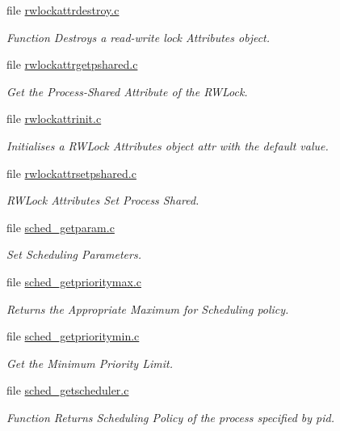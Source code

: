 \begin{DoxyCompactItemize}
file \mbox{\hyperlink{rwlockattrdestroy_8c}{rwlockattrdestroy.\+c}}
\begin{DoxyCompactList}\small\item\em Function Destroys a read-\/write lock Attributes object. \end{DoxyCompactList}\item 
file \mbox{\hyperlink{rwlockattrgetpshared_8c}{rwlockattrgetpshared.\+c}}
\begin{DoxyCompactList}\small\item\em Get the Process-\/\+Shared Attribute of the R\+W\+Lock. \end{DoxyCompactList}\item 
file \mbox{\hyperlink{rwlockattrinit_8c}{rwlockattrinit.\+c}}
\begin{DoxyCompactList}\small\item\em Initialises a R\+W\+Lock Attributes object attr with the default value. \end{DoxyCompactList}\item 
file \mbox{\hyperlink{rwlockattrsetpshared_8c}{rwlockattrsetpshared.\+c}}
\begin{DoxyCompactList}\small\item\em R\+W\+Lock Attributes Set Process Shared. \end{DoxyCompactList}\item 
file \mbox{\hyperlink{sched__getparam_8c}{sched\+\_\+getparam.\+c}}
\begin{DoxyCompactList}\small\item\em Set Scheduling Parameters. \end{DoxyCompactList}\item 
file \mbox{\hyperlink{sched__getprioritymax_8c}{sched\+\_\+getprioritymax.\+c}}
\begin{DoxyCompactList}\small\item\em Returns the Appropriate Maximum for Scheduling policy. \end{DoxyCompactList}\item 
file \mbox{\hyperlink{sched__getprioritymin_8c}{sched\+\_\+getprioritymin.\+c}}
\begin{DoxyCompactList}\small\item\em Get the Minimum Priority Limit. \end{DoxyCompactList}\item 
file \mbox{\hyperlink{sched__getscheduler_8c}{sched\+\_\+getscheduler.\+c}}
\begin{DoxyCompactList}\small\item\em Function Returns Scheduling Policy of the process specified by pid. \end{DoxyCompactList}\item 

\end{DoxyCompactItemize}
